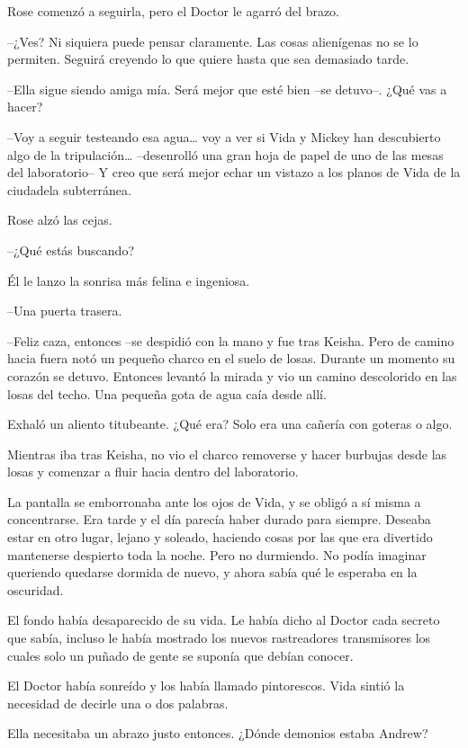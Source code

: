 {Rose comenzó a seguirla, pero el Doctor le agarró del brazo.}

{--¿Ves? Ni siquiera puede pensar claramente. Las cosas alienígenas no
 se lo permiten. Seguirá creyendo lo que quiere hasta que sea demasiado
tarde.}

{--Ella sigue siendo amiga mía. Será mejor que esté bien --se detuvo--.
¿Qué vas a hacer?}

{--Voy a seguir testeando esa agua\ldots{} voy a ver si Vida y Mickey
 han descubierto algo de la tripulación\ldots{} --desenrolló una gran
 hoja de papel de uno de las mesas del laboratorio-- Y creo que será
 mejor echar un vistazo a los planos de Vida de la ciudadela
subterránea.}

{Rose alzó las cejas.}

{--¿Qué estás buscando?}

{Él le lanzo la sonrisa más felina e ingeniosa.}

{--Una puerta trasera.}

{--Feliz caza, entonces --se despidió con la mano y fue tras Keisha.
 Pero de camino hacia fuera notó un pequeño charco en el suelo de losas.
 Durante un momento su corazón se detuvo. Entonces levantó la mirada y
 vio un camino descolorido en las losas del techo. Una pequeña gota de
agua caía desde allí.}

{Exhaló un aliento titubeante. ¿Qué era? Solo era una cañería con
goteras o algo.}

{Mientras iba tras Keisha, no vio el charco removerse y hacer burbujas
desde las losas y comenzar a fluir hacia dentro del laboratorio.}

\mbox{}

{La pantalla se emborronaba ante los ojos de Vida, y se obligó a sí
 misma a concentrarse. Era tarde y el día parecía haber durado para
 siempre. Deseaba estar en otro lugar, lejano y soleado, haciendo cosas
 por las que era divertido mantenerse despierto toda la noche. Pero no
 durmiendo. No podía imaginar queriendo quedarse dormida de nuevo, y
ahora sabía qué le esperaba en la oscuridad.}

{El fondo había desaparecido de su vida. Le había dicho al Doctor cada
 secreto que sabía, incluso le había mostrado los nuevos rastreadores
 transmisores los cuales solo un puñado de gente se suponía que debían
conocer.}

{El Doctor había sonreído y los había llamado pintorescos. Vida sintió
la necesidad de decirle una o dos palabras.}

{Ella necesitaba un abrazo justo entonces. ¿Dónde demonios estaba
Andrew?}

